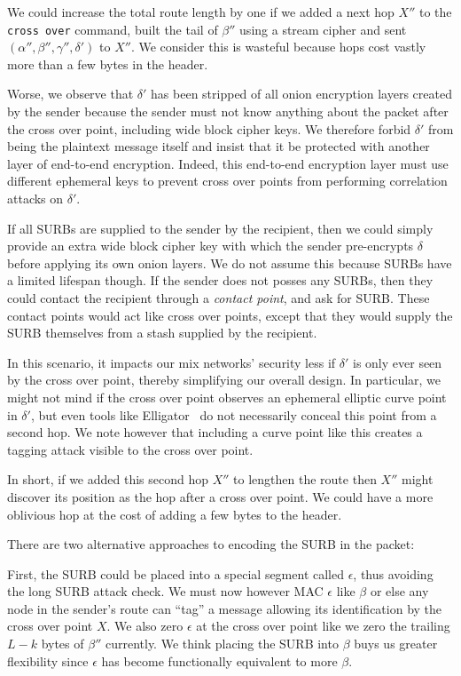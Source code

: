\smallskip 

We could increase the total route length by one if we added a next
hop $X''$ to the {\tt cross over} command, built the tail of $\beta''$
using a stream cipher and sent $(\alpha'',\beta'',\gamma'',\delta')$
to $X''$. We consider this is wasteful because hops cost vastly more
than a few bytes in the header.

Worse, we observe that $\delta'$ has been stripped of all onion
encryption layers created by the sender because the sender must not
know anything about the packet after the cross over point,
 including wide block cipher keys.
We therefore forbid $\delta'$ from being the plaintext message itself
and insist that it be protected with another layer of end-to-end
encryption.  Indeed, this end-to-end encryption layer must use
different ephemeral keys to prevent cross over points from performing
correlation attacks on $\delta'$.

If all SURBs are supplied to the sender by the recipient, then
we could simply provide an extra wide block cipher key with which
the sender pre-encrypts $\delta$ before applying its own onion layers.
We do not assume this because SURBs have a limited lifespan though.  
If the sender does not posses any SURBs, then they could contact the
recipient through a {\em contact point}, and ask for SURB. 
These contact points would act like cross over points, except
that they would supply the SURB themselves from a stash supplied by
the recipient.

In this scenario, it impacts our mix networks' security less if
$\delta'$ is only ever seen by the cross over point, thereby
simplifying our overall design.   In particular, we might not mind
if the cross over point observes an ephemeral elliptic curve point
in $\delta'$, but even tools like Elligator~\cite{elligator} do not
necessarily conceal this point from a second hop.  We note however
that including a curve point like this creates a tagging attack
visible to the cross over point.

In short, if we added this second hop $X''$ to lengthen the route
then $X''$ might discover its position as the hop after a cross over
point.  We could have a more oblivious hop at the cost of adding a
few bytes to the header.

\smallskip

There are two alternative approaches to encoding the SURB in the 
packet:  

First, the SURB could be placed into a special segment called
$\epsilon$, thus avoiding the long SURB attack check.
We must now however MAC $\epsilon$ like $\beta$ or else any
node in the sender's route can ``tag'' a message allowing its
identification by the cross over point $X$.  We also zero
$\epsilon$ at the cross over point like we zero the trailing
$L-k$ bytes of $\beta''$ currently.  We think placing the SURB
into $\beta$ buys us greater flexibility since $\epsilon$ has become
functionally equivalent to more $\beta$.

